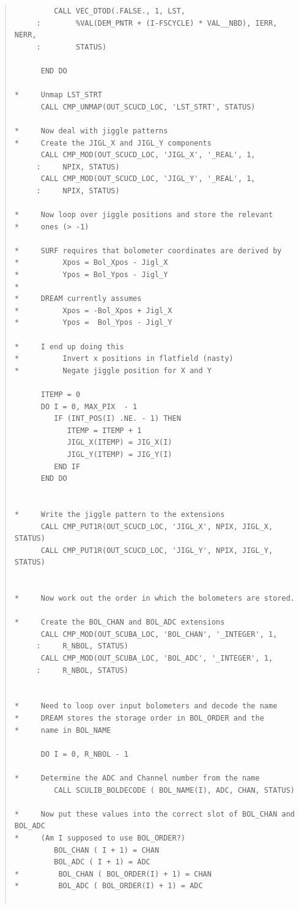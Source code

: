 \documentclass[twoside,11pt]{article}
\newenvironment{myquote}{\begin{quote}\begin{small}}{\end{small}\end{quote}}
\renewcommand{\_}{\texttt{\symbol{95}}}
\begin{document}
\begin{myquote}
\begin{verbatim}
         CALL VEC_DTOD(.FALSE., 1, LST,
     :        %VAL(DEM_PNTR + (I-FSCYCLE) * VAL__NBD), IERR, NERR,
     :        STATUS)

      END DO

*     Unmap LST_STRT
      CALL CMP_UNMAP(OUT_SCUCD_LOC, 'LST_STRT', STATUS)

*     Now deal with jiggle patterns
*     Create the JIGL_X and JIGL_Y components
      CALL CMP_MOD(OUT_SCUCD_LOC, 'JIGL_X', '_REAL', 1,
     :     NPIX, STATUS)
      CALL CMP_MOD(OUT_SCUCD_LOC, 'JIGL_Y', '_REAL', 1,
     :     NPIX, STATUS)

*     Now loop over jiggle positions and store the relevant
*     ones (> -1)

*     SURF requires that bolometer coordinates are derived by
*          Xpos = Bol_Xpos - Jigl_X
*          Ypos = Bol_Ypos - Jigl_Y
*
*     DREAM currently assumes
*          Xpos = -Bol_Xpos + Jigl_X
*          Ypos =  Bol_Ypos - Jigl_Y

*     I end up doing this
*          Invert x positions in flatfield (nasty)
*          Negate jiggle position for X and Y

      ITEMP = 0
      DO I = 0, MAX_PIX  - 1
         IF (INT_POS(I) .NE. - 1) THEN
            ITEMP = ITEMP + 1
            JIGL_X(ITEMP) = JIG_X(I)
            JIGL_Y(ITEMP) = JIG_Y(I)
         END IF
      END DO


*     Write the jiggle pattern to the extensions
      CALL CMP_PUT1R(OUT_SCUCD_LOC, 'JIGL_X', NPIX, JIGL_X, STATUS)
      CALL CMP_PUT1R(OUT_SCUCD_LOC, 'JIGL_Y', NPIX, JIGL_Y, STATUS)


*     Now work out the order in which the bolometers are stored.

*     Create the BOL_CHAN and BOL_ADC extensions
      CALL CMP_MOD(OUT_SCUBA_LOC, 'BOL_CHAN', '_INTEGER', 1,
     :     R_NBOL, STATUS)
      CALL CMP_MOD(OUT_SCUBA_LOC, 'BOL_ADC', '_INTEGER', 1,
     :     R_NBOL, STATUS)


*     Need to loop over input bolometers and decode the name
*     DREAM stores the storage order in BOL_ORDER and the
*     name in BOL_NAME

      DO I = 0, R_NBOL - 1

*     Determine the ADC and Channel number from the name
         CALL SCULIB_BOLDECODE ( BOL_NAME(I), ADC, CHAN, STATUS)

*     Now put these values into the correct slot of BOL_CHAN and BOL_ADC
*     (Am I supposed to use BOL_ORDER?)
         BOL_CHAN ( I + 1) = CHAN
         BOL_ADC ( I + 1) = ADC
*         BOL_CHAN ( BOL_ORDER(I) + 1) = CHAN
*         BOL_ADC ( BOL_ORDER(I) + 1) = ADC


\end{verbatim}
\end{myquote}
\end{document}

